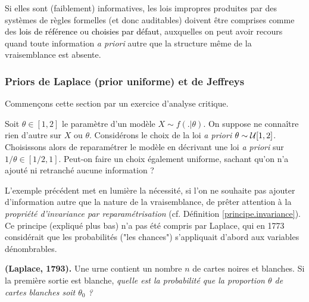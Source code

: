 Si elles sont (faiblement) informatives, les lois impropres produites par des systèmes de règles formelles (et donc auditables) doivent être comprises comme des \textcolor{black}{lois de référence} ou \textcolor{black}{choisies par défaut}, auxquelles on peut avoir recours quand toute information {\it a priori} autre que la structure même de la vraisemblance est absente. \\




\subsubsection{Priors de Laplace (prior uniforme) et de Jeffreys}

Commen\c cons cette section par un exercice d'analyse critique. 

\begin{exec}\label{prior.unif.0}
Soit $\theta\in[1,2]$ le paramètre d'un modèle $X\sim f(.|\theta)$. On suppose ne connaître rien d'autre sur $X$ ou $\theta$. Considérons le choix de la loi {\it a priori} $\theta\sim{\cal{U}}[1,2]$. Choisissons alors de reparamétrer le modèle en décrivant une loi {\it a priori} sur $1/\theta\in[1/2,1]$. Peut-on faire un choix également uniforme, sachant qu'on n'a ajouté ni retranché aucune information ?\\
\end{exec}

L'exemple précédent met en lumière la nécessité, si l'on ne souhaite pas ajouter d'information autre que la nature de la vraisemblance, de prêter attention à la \emph{propriété d'invariance par reparamétrisation} (cf. Définition \ref{principe.invariance}). Ce principe (expliqué plus bas) n'a pas été compris par Laplace, qui en 1773 considérait que les probabilités ("les chances") s'appliquait d'abord aux variables dénombrables. \\

\begin{exec}{\bf (Laplace, 1793).}
Une urne contient un nombre $n$ de cartes noires et blanches. Si la première sortie est blanche, {\it quelle est la probabilité que la proportion $\theta$ de cartes blanches soit $\theta_0$ ?} 
\end{exec}

